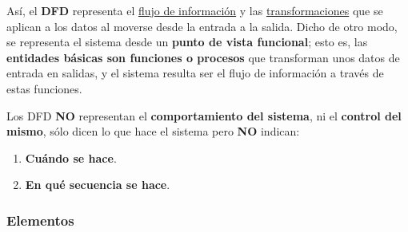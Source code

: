Así, el \textbf{DFD} representa el \uline{flujo de información} y las \uline{transformaciones} que se aplican a los datos al moverse desde la entrada a la salida. Dicho de otro modo, se representa el sistema desde un \textbf{punto de vista funcional}; esto es, las \textbf{entidades básicas son funciones o procesos} que transforman unos datos de entrada en salidas, y el sistema resulta ser el flujo de información a través de estas funciones.

Los DFD \textbf{NO} representan el \textbf{comportamiento del sistema}, ni el \textbf{control del mismo}, sólo dicen lo que hace el sistema pero \textbf{NO} indican:

\begin{enumerate}
    \item \textbf{Cuándo se hace}.
    \item \textbf{En qué secuencia se hace}.
\end{enumerate}

\subsubsection{Elementos}

